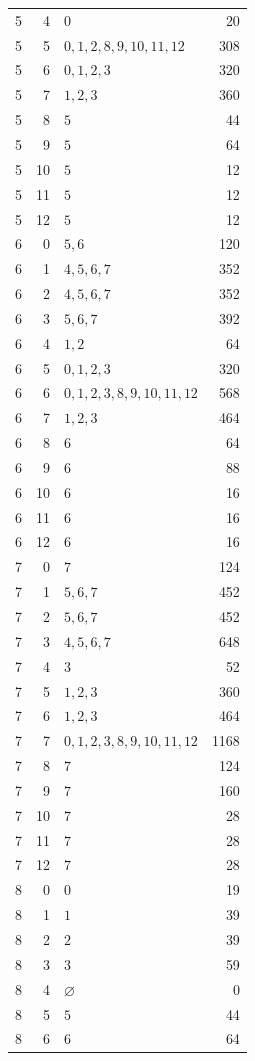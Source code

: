 \begin{longtable}{rrlr}
5 & 4 & $0$ & 20\\
5 & 5 & $0,1,2,8,9,10,11,12$ & 308\\
5 & 6 & $0,1,2,3$ & 320\\
5 & 7 & $1,2,3$ & 360\\
5 & 8 & $5$ & 44\\
5 & 9 & $5$ & 64\\
5 & 10 & $5$ & 12\\
5 & 11 & $5$ & 12\\
5 & 12 & $5$ & 12\\
6 & 0 & $5,6$ & 120\\
6 & 1 & $4,5,6,7$ & 352\\
6 & 2 & $4,5,6,7$ & 352\\
6 & 3 & $5,6,7$ & 392\\
6 & 4 & $1,2$ & 64\\
6 & 5 & $0,1,2,3$ & 320\\
6 & 6 & $0,1,2,3,8,9,10,11,12$ & 568\\
6 & 7 & $1,2,3$ & 464\\
6 & 8 & $6$ & 64\\
6 & 9 & $6$ & 88\\
6 & 10 & $6$ & 16\\
6 & 11 & $6$ & 16\\
6 & 12 & $6$ & 16\\
7 & 0 & $7$ & 124\\
7 & 1 & $5,6,7$ & 452\\
7 & 2 & $5,6,7$ & 452\\
7 & 3 & $4,5,6,7$ & 648\\
7 & 4 & $3$ & 52\\
7 & 5 & $1,2,3$ & 360\\
7 & 6 & $1,2,3$ & 464\\
7 & 7 & $0,1,2,3,8,9,10,11,12$ & 1168\\
7 & 8 & $7$ & 124\\
7 & 9 & $7$ & 160\\
7 & 10 & $7$ & 28\\
7 & 11 & $7$ & 28\\
7 & 12 & $7$ & 28\\
8 & 0 & $0$ & 19\\
8 & 1 & $1$ & 39\\
8 & 2 & $2$ & 39\\
8 & 3 & $3$ & 59\\
8 & 4 & $\varnothing$ & 0\\
8 & 5 & $5$ & 44\\
8 & 6 & $6$ & 64\\

\end{longtable}
